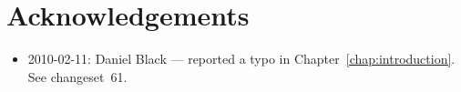 
\chapter{Acknowledgements}

\begin{itemize}
\item 2010-02-11: Daniel Black --- reported a typo in
  Chapter~\ref{chap:introduction}. See changeset~61.
\end{itemize}
